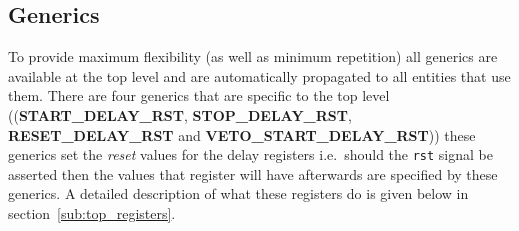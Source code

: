 \subsection{Generics} %
\label{sub:top_generics}
To provide maximum flexibility (as well as minimum repetition) all generics are available at the top level and are automatically propagated to all entities that use them. There are four generics that are specific to the top level ((\textbf{START\_DELAY\_RST}, \textbf{STOP\_DELAY\_RST}, \textbf{RESET\_DELAY\_RST} and \textbf{VETO\_START\_DELAY\_RST})) these generics set the \emph{reset} values for the delay registers i.e.\ should the \texttt{rst} signal be asserted then the values that register will have afterwards are specified by these generics. A detailed description of what these registers do is given below in section~\ref{sub:top_registers}.
